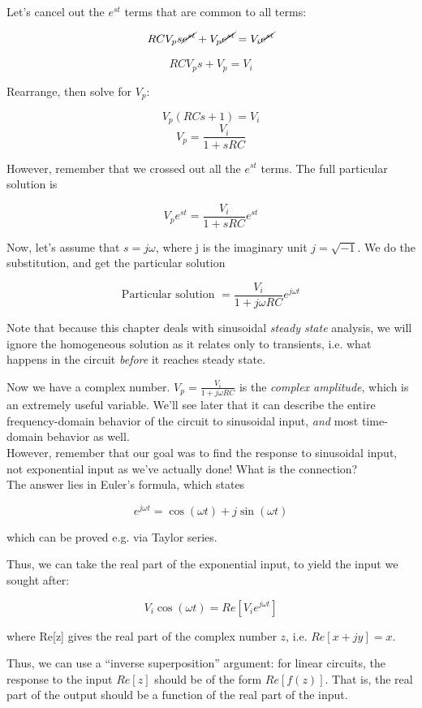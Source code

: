 \documentclass[12pt,a4paper]{report}
\begin{document}
Let's cancel out the $\displaystyle e^{s t}$ terms that are common to all terms:

\[ RC V_p s \cancel{e^{s t}} + V_p \cancel{e^{s t}} = V_i \cancel{e^{s t}} \]

\[ RC V_p s + V_p = V_i \]

Rearrange, then solve for $V_p$:

\[ V_p (RC s + 1) = V_i \]
\[ V_p = \frac{V_i}{1 + sRC} \]

However, remember that we crossed out all the $\displaystyle e^{s t}$ terms. The full particular solution is

\[ V_p e^{s t} =  \frac{V_i}{1 + sRC} e^{s t} \]

Now, let's assume that $s = j \omega$, where j is the imaginary unit $j = \sqrt{-1}$. We do the substitution, and get the particular solution

\[ \text{Particular solution } = \frac{V_i}{1 + j \omega RC} e^{j \omega t} \]

Note that because this chapter deals with sinusoidal \emph{steady state} analysis, we will ignore the homogeneous solution as it relates only to transients, i.e. what happens in the circuit \emph{before} it reaches steady state.

Now we have a complex number. $\displaystyle V_p = \frac{V_i}{1 + j \omega RC}$ is the \emph{complex amplitude}, which is an extremely useful variable. We'll see later that it can describe the entire frequency-domain behavior of the circuit to sinusoidal input, \emph{and} most time-domain behavior as well.\\

However, remember that our goal was to find the response to sinusoidal input, not exponential input as we've actually done! What is the connection?\\
The answer lies in Euler's formula, which states

\[ e^{j \omega t} = \cos{(\omega t)} + j \sin{(\omega t)} \]

which can be proved e.g. via Taylor series.

Thus, we can take the real part of the exponential input, to yield the input we sought after:

\[ V_i \cos{(\omega t)} = Re\left[ V_i e^{j \omega t} \right] \]

where Re[z] gives the real part of the complex number $z$, i.e. $Re[x + jy] = x$.

Thus, we can use a ``inverse superposition'' argument: for linear circuits, the response to the input $Re[z]$ should be of the form $Re[f(z)]$. That is, the real part of the output should be a function of the real part of the input.\\
\end{document}
